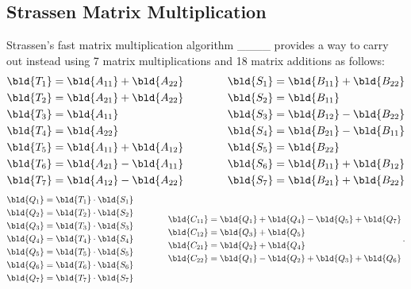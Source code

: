 \subsection{Strassen Matrix Multiplication}
Strassen's fast matrix multiplication algorithm ____
provides a way to carry out  instead using 7 matrix \block multiplications and 18 matrix \block additions as follows:
\begin{align}
  \label{smm:eq:strass-first}
  \begin{split}
    \bld{T_{1}} &= \bld{A_{11}} + \bld{A_{22}}  \\
    \bld{T_{2}} &= \bld{A_{21}} + \bld{A_{22}}  \\
    \bld{T_{3}} &= \bld{A_{11}}  \\
    \bld{T_{4}} &= \bld{A_{22}}  \\
    \bld{T_{5}} &= \bld{A_{11}} + \bld{A_{12}}  \\
    \bld{T_{6}} &= \bld{A_{21}} - \bld{A_{11}}  \\
    \bld{T_{7}} &= \bld{A_{12}} - \bld{A_{22}}
  \end{split}
  \qquad\qquad
  \begin{split}
    \bld{S_{1}} &= \bld{B_{11}} + \bld{B_{22}}  \\
    \bld{S_{2}} &= \bld{B_{11}}  \\
    \bld{S_{3}} &= \bld{B_{12}} - \bld{B_{22}}  \\
    \bld{S_{4}} &= \bld{B_{21}} - \bld{B_{11}}  \\
    \bld{S_{5}} &= \bld{B_{22}}  \\
    \bld{S_{6}} &= \bld{B_{11}} + \bld{B_{12}}  \\
    \bld{S_{7}} &= \bld{B_{21}} + \bld{B_{22}}
  \end{split}
\end{align}
\begin{align}
  \begin{split}
    \bld{Q_{1}} &= \bld{T_{1}} \cdot \bld{S_{1}} \\
    \bld{Q_{2}} &= \bld{T_{2}} \cdot \bld{S_{2}} \\
    \bld{Q_{3}} &= \bld{T_{3}} \cdot \bld{S_{3}} \\
    \bld{Q_{4}} &= \bld{T_{4}} \cdot \bld{S_{4}} \\
    \bld{Q_{5}} &= \bld{T_{5}} \cdot \bld{S_{5}} \\
    \bld{Q_{6}} &= \bld{T_{6}} \cdot \bld{S_{6}} \\
    \bld{Q_{7}} &= \bld{T_{7}} \cdot \bld{S_{7}} \\
  \end{split}
  \qquad\qquad
  \begin{split}
    \label{smm:eq:strass-last}
    \bld{C_{11}} &= \bld{Q_1} + \bld{Q_4} - \bld{Q_5} + \bld{Q_7} \\
    \bld{C_{12}} &= \bld{Q_3} + \bld{Q_5} \\
    \bld{C_{21}} &= \bld{Q_2} + \bld{Q_4} \\
    \bld{C_{22}} &= \bld{Q_1} - \bld{Q_2} + \bld{Q_3} + \bld{Q_6} \\
  \end{split} \,.
\end{align}
